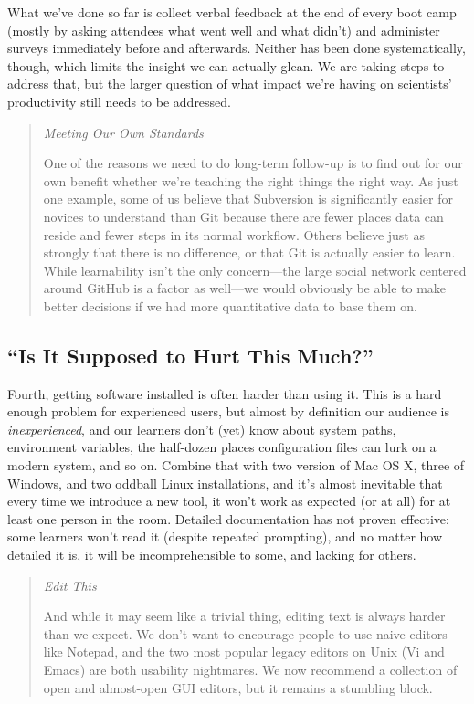 \documentclass{article}
\begin{document}
What we've done so far is collect verbal feedback at the end of every
boot camp (mostly by asking attendees what went well and what didn't)
and administer surveys immediately before and afterwards. Neither has
been done systematically, though, which limits the insight we can
actually glean. We are taking steps to address that, but the larger
question of what impact we're having on scientists' productivity still
needs to be addressed.

\begin{quote}
\emph{Meeting Our Own Standards}

One of the reasons we need to do long-term follow-up is to find out for
our own benefit whether we're teaching the right things the right way.
As just one example, some of us believe that Subversion is significantly
easier for novices to understand than Git because there are fewer places
data can reside and fewer steps in its normal workflow. Others believe
just as strongly that there is no difference, or that Git is actually
easier to learn. While learnability isn't the only concern---the large
social network centered around GitHub is a factor as well---we would
obviously be able to make better decisions if we had more quantitative
data to base them on.
\end{quote}

\subsection{``Is It Supposed to Hurt This Much?''}

Fourth, getting software installed is often harder than using it. This
is a hard enough problem for experienced users, but almost by definition
our audience is \emph{inexperienced}, and our learners don't (yet) know
about system paths, environment variables, the half-dozen places
configuration files can lurk on a modern system, and so on. Combine that
with two version of Mac OS X, three of Windows, and two oddball Linux
installations, and it's almost inevitable that every time we introduce a
new tool, it won't work as expected (or at all) for at least one person
in the room. Detailed documentation has not proven effective: some
learners won't read it (despite repeated prompting), and no matter how
detailed it is, it will be incomprehensible to some, and lacking for
others.

\begin{quote}
\emph{Edit This}

And while it may seem like a trivial thing, editing text is always
harder than we expect. We don't want to encourage people to use naive
editors like Notepad, and the two most popular legacy editors on Unix
(Vi and Emacs) are both usability nightmares. We now recommend a
collection of open and almost-open GUI editors, but it remains a
stumbling block.
\end{quote}
\end{document}
